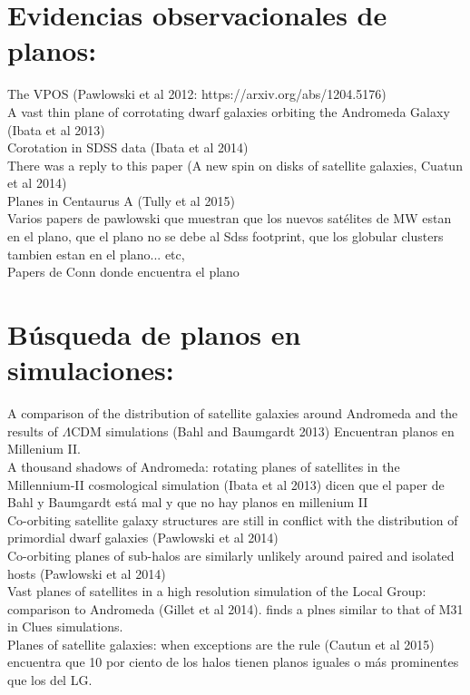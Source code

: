 \documentclass{article}
\begin{document}
\section{Evidencias observacionales de planos:}
\noindent The VPOS (Pawlowski et al 2012: https://arxiv.org/abs/1204.5176)\\
A vast thin plane of corrotating dwarf galaxies orbiting the Andromeda
Galaxy (Ibata et al 2013)\\
Corotation in SDSS data (Ibata et al 2014)\\
There was a reply to this paper (A new spin on disks of satellite
galaxies, Cuatun et al 2014)\\
Planes in Centaurus A (Tully et al 2015)\\
Varios papers de pawlowski que muestran que los nuevos sat\'elites de
MW estan en el plano, que el plano no se debe al Sdss footprint, que
los globular clusters tambien estan en el plano... etc,\\ 
Papers de Conn donde encuentra el plano\\

\section{B\'usqueda de planos en simulaciones:}
\noindent A comparison of the distribution of satellite galaxies
around Andromeda and the results of $\Lambda$CDM simulations (Bahl and
Baumgardt 2013) Encuentran planos en Millenium II.\\
A thousand shadows of Andromeda: rotating planes of satellites in the
Millennium-II cosmological simulation (Ibata et al 2013) dicen que el
paper de Bahl y Baumgardt est\'a mal y que no hay planos en millenium
II\\
Co-orbiting satellite galaxy structures are still in conflict with the
distribution of primordial dwarf galaxies (Pawlowski et al 2014)\\
Co-orbiting planes of sub-halos are similarly unlikely around paired
and isolated hosts (Pawlowski et al 2014)\\
Vast planes of satellites in a high resolution simulation of the Local
Group: comparison to Andromeda (Gillet et al 2014). finds a plnes
similar to that of M31 in Clues simulations.\\
Planes of satellite galaxies: when exceptions are the rule (Cautun et
al 2015) encuentra que 10 por ciento de los halos tienen planos
iguales o m\'as prominentes que los del LG.\\
\end{document}
